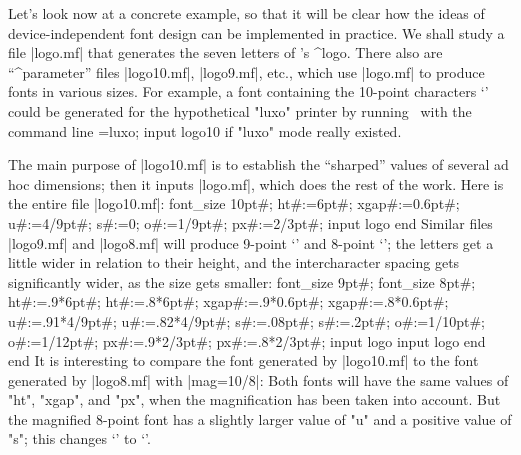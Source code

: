 {{{{%

Let's look now at a concrete example, so that it will be clear how the
ideas of device-independent font design can be implemented in practice.
We shall study a file |logo.mf| that generates the seven letters of
\MF's ^{logo}. There also are ``^{parameter}'' files |logo10.mf|, |logo9.mf|,
etc., which use |logo.mf| to produce fonts in various sizes. For
example, a font containing the 10-point characters `\thinspace\MF\thinspace'
could be generated for the hypothetical "luxo" printer by running \MF\ with
the command line
\begintt
\mode=luxo; input logo10
\endtt
if "luxo" mode really existed.

The main purpose of |logo10.mf| is to establish the ``sharped'' values of
several ad hoc dimensions; then it inputs |logo.mf|, which does the
rest of the work. Here is the entire file |logo10.mf|:
\begintt
font_size 10pt#;   %
ht#:=6pt#;         %
xgap#:=0.6pt#;     %
u#:=4/9pt#;        %
s#:=0;             %
o#:=1/9pt#;        %
px#:=2/3pt#;       %
input logo         %
end                %
\endtt
Similar files |logo9.mf| and |logo8.mf| will produce 9-point
`\thinspace' and \hbox{8-point}
`\thinspace'; the letters get a little
wider in relation to their height, and the intercharacter spacing
gets significantly wider, as the size gets smaller:
\begintt
font_size 9pt#;                font_size 8pt#;
ht#:=.9*6pt#;                  ht#:=.8*6pt#;
xgap#:=.9*0.6pt#;              xgap#:=.8*0.6pt#;
u#:=.91*4/9pt#;                u#:=.82*4/9pt#;
s#:=.08pt#;                    s#:=.2pt#;
o#:=1/10pt#;                   o#:=1/12pt#;
px#:=.9*2/3pt#;                px#:=.8*2/3pt#;
input logo                     input logo
end                            end
\endtt
It is interesting to compare the font generated by |logo10.mf| to the
font generated by |logo8.mf| with |mag=10/8|: Both fonts will have
the same values of "ht", "xgap", and "px", when the magnification has been
taken into account. But the magnified 8-point font has a slightly larger
value of "u" and a positive value of "s"; this changes
`\thinspace\MF\thinspace' to `\thinspace'.

}}}}
